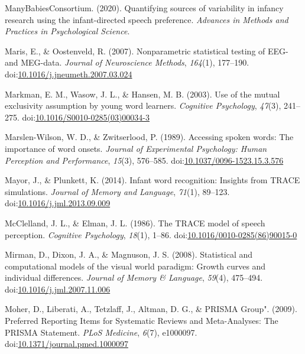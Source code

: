 \documentclass[
  man, noextraspace]{apa6}
\begin{document}
\leavevmode\hypertarget{ref-MB1}{}%
ManyBabiesConsortium. (2020). Quantifying sources of variability in infancy research using the infant-directed speech preference. \emph{Advances in Methods and Practices in Psychological Science}.

\leavevmode\hypertarget{ref-Maris2007}{}%
Maris, E., \& Oostenveld, R. (2007). Nonparametric statistical testing of EEG- and MEG-data. \emph{Journal of Neuroscience Methods}, \emph{164}(1), 177--190. doi:\href{https://doi.org/10.1016/j.jneumeth.2007.03.024}{10.1016/j.jneumeth.2007.03.024}

\leavevmode\hypertarget{ref-Markman2003}{}%
Markman, E. M., Wasow, J. L., \& Hansen, M. B. (2003). Use of the mutual exclusivity assumption by young word learners. \emph{Cognitive Psychology}, \emph{47}(3), 241--275. doi:\href{https://doi.org/10.1016/S0010-0285(03)00034-3}{10.1016/S0010-0285(03)00034-3}

\leavevmode\hypertarget{ref-Marslen-Wilson1989}{}%
Marslen-Wilson, W. D., \& Zwitserlood, P. (1989). Accessing spoken words: The importance of word onsets. \emph{Journal of Experimental Psychology: Human Perception and Performance}, \emph{15}(3), 576--585. doi:\href{https://doi.org/10.1037/0096-1523.15.3.576}{10.1037/0096-1523.15.3.576}

\leavevmode\hypertarget{ref-Mayor2014}{}%
Mayor, J., \& Plunkett, K. (2014). Infant word recognition: Insights from TRACE simulations. \emph{Journal of Memory and Language}, \emph{71}(1), 89--123. doi:\href{https://doi.org/10.1016/j.jml.2013.09.009}{10.1016/j.jml.2013.09.009}

\leavevmode\hypertarget{ref-McClelland1986}{}%
McClelland, J. L., \& Elman, J. L. (1986). The TRACE model of speech perception. \emph{Cognitive Psychology}, \emph{18}(1), 1--86. doi:\href{https://doi.org/10.1016/0010-0285(86)90015-0}{10.1016/0010-0285(86)90015-0}

\leavevmode\hypertarget{ref-Mirman2008}{}%
Mirman, D., Dixon, J. A., \& Magnuson, J. S. (2008). Statistical and computational models of the visual world paradigm: Growth curves and individual differences. \emph{Journal of Memory \& Language}, \emph{59}(4), 475--494. doi:\href{https://doi.org/10.1016/j.jml.2007.11.006}{10.1016/j.jml.2007.11.006}

\leavevmode\hypertarget{ref-Moher2009}{}%
Moher, D., Liberati, A., Tetzlaff, J., Altman, D. G., \& PRISMA Group". (2009). Preferred Reporting Items for Systematic Reviews and Meta-Analyses: The PRISMA Statement. \emph{PLoS Medicine}, \emph{6}(7), e1000097. doi:\href{https://doi.org/10.1371/journal.pmed.1000097}{10.1371/journal.pmed.1000097}
\end{document}
